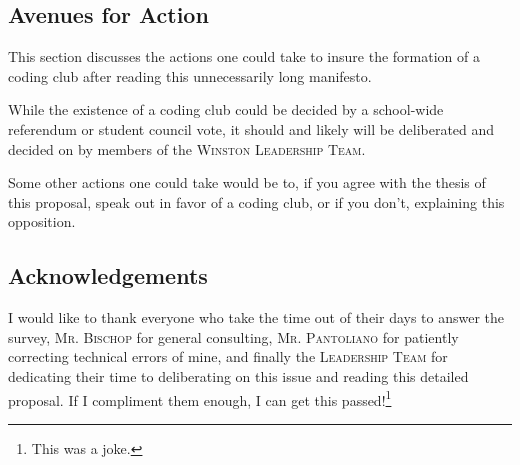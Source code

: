 \documentclass{report}
\begin{document}
            \subsection{Avenues for Action}

                This section discusses the actions one could take to insure the formation of a coding club after reading this unnecessarily long manifesto.

                While the existence of a coding club could be decided by a school-wide referendum or student council vote, it should and likely will be deliberated and decided on by members of the \textsc{Winston Leadership Team}.

                Some other actions one could take would be to, if you agree with the thesis of this proposal, speak out in favor of a coding club, or if you don't, explaining this opposition.

            \subsection{Acknowledgements}

                I would like to thank everyone who take the time out of their days to answer the survey, \textsc{Mr. Bischop} for general consulting, \textsc{Mr. Pantoliano} for patiently correcting technical errors of mine, and finally the \textsc{Leadership Team} for dedicating their time to deliberating on this issue and reading this detailed proposal. If I compliment them enough, I can get this passed!\footnote{This was a joke.}
\end{document}
